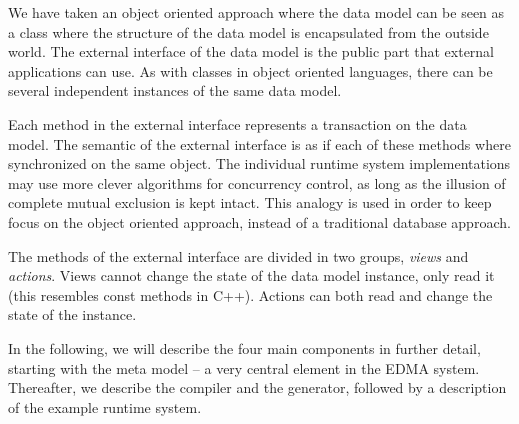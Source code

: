We have taken an object oriented approach where the data model can
be seen as a class where the structure of the data model is encapsulated
from the outside world. The external interface of the data model is
the public part that external applications can use. As with classes
in object oriented languages, there can be several independent instances
of the same data model.

Each method in the external interface represents a transaction on
the data model. The semantic of the external interface is as if each
of these methods where synchronized on the same object. The individual
runtime system implementations may use more clever algorithms for
concurrency control, as long as the illusion of complete mutual exclusion
is kept intact. This analogy is used in order to keep focus on the
object oriented approach, instead of a traditional database approach.

The methods of the external interface are divided in two groups, \emph{views}
and \emph{actions}. Views cannot change the state of the data model
instance, only read it (this resembles const methods in C++). Actions
can both read and change the state of the instance.

In the following, we will describe the four main components in further
detail, starting with the meta model -- a very central element in
the EDMA system. Thereafter, we describe the compiler and the generator,
followed by a description of the example runtime system.










